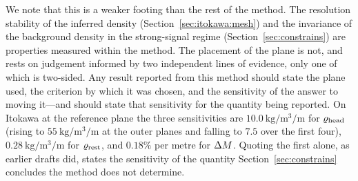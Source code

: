 We note that this is a weaker footing than the rest of the method. The
resolution stability of the inferred density
(Section~\ref{sec:itokawa:mesh}) and the invariance of the background
density in the strong-signal regime (Section~\ref{sec:constrains}) are
properties measured within the method. The placement of the plane is not,
and rests on judgement informed by two independent lines of evidence, only
one of which is two-sided. Any result reported from this method should state
the plane used, the criterion by which it was chosen, and the sensitivity of
the answer to moving it---and should state that sensitivity for the quantity
being reported. On Itokawa at the reference plane the three sensitivities
are $\SI{10.0}{\kilo\gram\per\cubic\metre\per\metre}$ for $\varrho_{\mathrm{head}}$
(rising to $\SI{55}{\kilo\gram\per\cubic\metre\per\metre}$ at the outer
planes and falling to $7.5$ over the first four),
$\SI{0.28}{\kilo\gram\per\cubic\metre\per\metre}$ for $\varrho_{\mathrm{rest}}$, and
$0.18\%$ per metre for $\Delta M$. Quoting the first alone, as earlier drafts
did, states the sensitivity of the quantity
Section~\ref{sec:constrains} concludes the method does not determine.